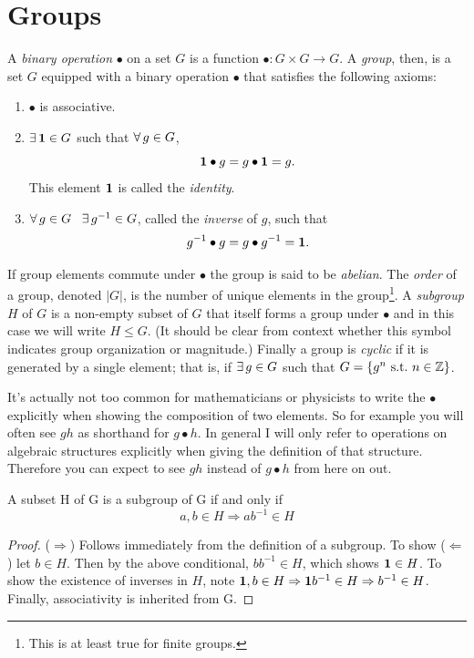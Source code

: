 \section{Groups}\label{sec:gpprelim}


A {\it binary operation} $\bullet$ on a set 
$G$ is a function $\bullet : G\times G\to G$. A {\it group}, 
then, is a set $G$ equipped with a binary operation $\bullet$ that satisfies 
the following axioms:
  \begin{enumerate}
    \item $\bullet$ is associative.
    \item $\operatorname{\exists} {\mathbf 1} \in G$ such that $\operatorname{\forall} g \in G$, 
          \begin{equation}
            {\mathbf 1}\bullet g=g\bullet {\mathbf 1}=g. 
          \end{equation} This element ${\mathbf 1}$ is called the {\it identity}.
    \item $\operatorname{\forall} g \in G\ \ \operatorname{\exists} g^{-1} \in G$, called the 
          {\it inverse} of $g$, such that
          \begin{equation}
            g^{-1}\bullet g=g\bullet g^{-1}={\mathbf 1}.
          \end{equation}
  \end{enumerate}
If group elements commute under $\bullet$ the group is said to be 
{\it abelian}. The {\it order} of a group, 
denoted $|G|$, is the number of unique elements in the group\footnote{This
is at least true for finite groups.}. A {\it subgroup}
$H$ of $G$ is a non-empty subset of $G$ that itself forms a group under 
$\bullet$ and in this case we will write $H\leq G$. 
(It should be clear from context whether this symbol indicates group 
organization or magnitude.) Finally a group is {\it cyclic}
if it is generated by a single element; that is, if $\operatorname{\exists} g\in G$ such that 
$G=\{g^{n}~\text{s.t.}~ n\in\mathbb{Z}\}$.

It's actually not too common for mathematicians or physicists to write the
$\bullet$ explicitly when showing the composition of two elements. So for
example you will often see $gh$ as shorthand for $g\bullet h$. In general I will
only refer to operations on algebraic structures explicitly when giving the
definition of that structure. Therefore you can expect to see $gh$ instead of
$g\bullet h$ from here on out.

\begin{proposition}{}{}
  A subset H of G is a subgroup of G if and only if
  $$a,b\in H\Rightarrow ab^{-1}\in H$$
  \begin{proof}
    ($\Rightarrow$) Follows immediately from the definition of a subgroup. To 
    show ($\Leftarrow$) let $b\in H$. Then by the above conditional, $bb^{-1}
    \in H$, which shows ${\mathbf 1}\in H$. To show the existence of inverses in $H$, 
    note ${\mathbf 1},b\in H\Rightarrow {\mathbf 1} b^{-1}\in H\Rightarrow b^{-1}\in H$. 
    Finally, associativity is inherited from G.
  \end{proof}
\end{proposition}

